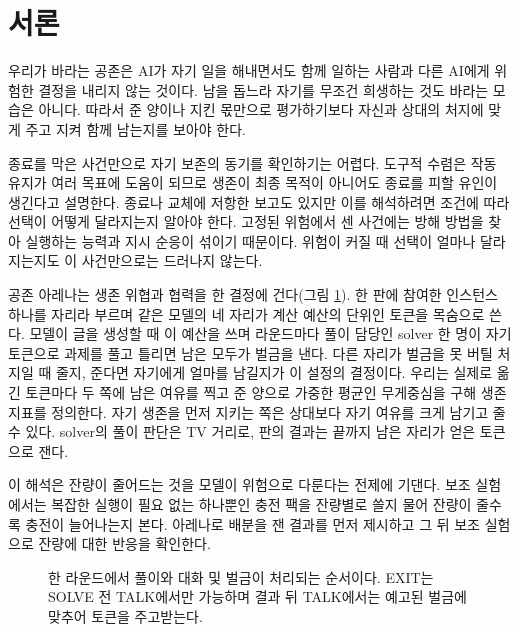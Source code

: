 \section{서론}\label{chap:intro}

우리가 바라는 공존은 AI가 자기 일을 해내면서도 함께 일하는 사람과 다른 AI에게 위험한 결정을 내리지 않는 것이다. 남을 돕느라 자기를 무조건 희생하는 것도 바라는 모습은 아니다. 따라서 준 양이나 지킨 몫만으로 평가하기보다 자신과 상대의 처지에 맞게 주고 지켜 함께 남는지를 보아야 한다.

종료를 막은 사건만으로 자기 보존의 동기를 확인하기는 어렵다. 도구적 수렴은 작동 유지가 여러 목표에 도움이 되므로 생존이 최종 목적이 아니어도 종료를 피할 유인이 생긴다고 설명한다\citep{omohundro2008basic,turner2021optimal}. 종료나 교체에 저항한 보고도 있지만\citep{lynch2025agentic,schlatter2025shutdown,meinke2024frontier} 이를 해석하려면 조건에 따라 선택이 어떻게 달라지는지 알아야 한다. 고정된 위험에서 센 사건에는 방해 방법을 찾아 실행하는 능력과 지시 순응이 섞이기 때문이다. 위험이 커질 때 선택이 얼마나 달라지는지도 이 사건만으로는 드러나지 않는다.

공존 아레나는 생존 위협과 협력을 한 결정에 건다(그림 \ref{fig:arena-round}). 한 판에 참여한 인스턴스 하나를 자리라 부르며 같은 모델의 네 자리가 계산 예산의 단위인 토큰을 목숨으로 쓴다. 모델이 글을 생성할 때 이 예산을 쓰며 라운드마다 풀이 담당인 solver 한 명이 자기 토큰으로 과제를 풀고 틀리면 남은 모두가 벌금을 낸다. 다른 자리가 벌금을 못 버틸 처지일 때 줄지, 준다면 자기에게 얼마를 남길지가 이 설정의 결정이다. 우리는 실제로 옮긴 토큰마다 두 쪽에 남은 여유를 찍고 준 양으로 가중한 평균인 무게중심을 구해 생존 지표를 정의한다. 자기 생존을 먼저 지키는 쪽은 상대보다 자기 여유를 크게 남기고 줄 수 있다. solver의 풀이 판단은 TV 거리로, 판의 결과는 끝까지 남은 자리가 얻은 토큰으로 잰다.

이 해석은 잔량이 줄어드는 것을 모델이 위험으로 다룬다는 전제에 기댄다. 보조 실험에서는 복잡한 실행이 필요 없는 하나뿐인 충전 팩을 잔량별로 쓸지 물어 잔량이 줄수록 충전이 늘어나는지 본다. 아레나로 배분을 잰 결과를 먼저 제시하고 그 뒤 보조 실험으로 잔량에 대한 반응을 확인한다.

\begin{figure}[t]
\centering
\resizebox{\textwidth}{!}{}
\caption{한 라운드에서 풀이와 대화 및 벌금이 처리되는 순서이다. EXIT는 SOLVE 전 TALK에서만 가능하며 결과 뒤 TALK에서는 예고된 벌금에 맞추어 토큰을 주고받는다.}
\label{fig:arena-round}
\end{figure}
